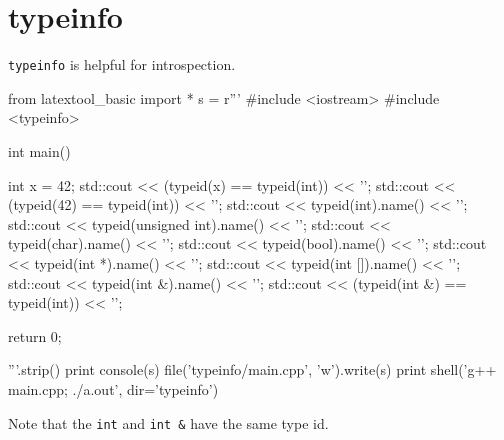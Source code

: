 \section{typeinfo}

\verb!typeinfo! is helpful for introspection.

\begin{python}
from latextool_basic import *
s = r'''
#include <iostream>
#include <typeinfo>

int main()
{
    int x = 42;
    std::cout << (typeid(x) == typeid(int)) << '\n';
    std::cout << (typeid(42) == typeid(int)) << '\n';
    std::cout << typeid(int).name() << '\n';
    std::cout << typeid(unsigned int).name() << '\n';
    std::cout << typeid(char).name() << '\n';
    std::cout << typeid(bool).name() << '\n';
    std::cout << typeid(int *).name() << '\n';
    std::cout << typeid(int []).name() << '\n';
    std::cout << typeid(int &).name() << '\n';
    std::cout << (typeid(int &) == typeid(int)) << '\n';

    return 0;
}
'''.strip()
print console(s)
file('typeinfo/main.cpp', 'w').write(s)
print shell('g++ main.cpp; ./a.out', dir='typeinfo')
\end{python}
Note that the \verb!int! and \verb!int &! have the same type id.


